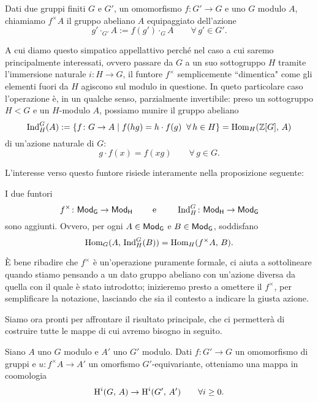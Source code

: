 \begin{definition}
	Dati due gruppi finiti $ G $ e $ G' $, un omomorfismo $ f \colon G' \to G $ e uno $ G $ modulo $ A $, chiamiamo $ f^\times A $ il gruppo abeliano $ A $ equipaggiato dell'azione
	\[ g' \cdot_{G'} A := f(g') \cdot_{G} A \qquad \forall\, g' \in G'. \]
\end{definition}

A cui diamo questo simpatico appellattivo perché nel caso a cui saremo principalmente interessati, ovvero passare da $ G $ a un suo sottogruppo $ H $ tramite l'immersione naturale $ i \colon H \to G $, il funtore $ f^\times $ semplicemente \textquotedblleft dimentica" come gli elementi fuori da $ H $ agiscono sul modulo in questione. In queto particolare caso l'operazione è, in un qualche senso, parzialmente invertibile: preso un sottogruppo $ H < G $ e un $ H $-modulo $ A $, possiamo munire il gruppo abeliano
\[ \operatorname{Ind}_H^G(A) := \{ f \colon G \to A \mid f(hg) = h \cdot f(g) \;\; \forall\, h \in H \} = \operatorname{Hom}_H(\mathbb{Z}[G], \, A) \]
di un'azione naturale di $ G $:
\[g \cdot f(x) = f(xg) \qquad\forall\, g \in G. \]

L'interesse verso questo funtore risiede interamente nella proposizione seguente:

\begin{proposition}\label{aggiunzione}
	I due funtori
	\[ f^\times \colon \mathsf{Mod}_\mathsf{G} \to \mathsf{Mod}_\mathsf{H} \qquad\text{ e }\qquad  \operatorname{Ind}_H^G \colon \mathsf{Mod}_\mathsf{H} \to \mathsf{Mod}_\mathsf{G} \]
	sono aggiunti. Ovvero, per ogni $ A \in \mathsf{Mod}_\mathsf{G} $ e $ B \in \mathsf{Mod}_\mathsf{G} $, soddisfano
	\[ \operatorname{Hom}_G(A,\, \operatorname{Ind}_H^G(B)) = \operatorname{Hom}_H(f^\times A, \, B). \]
\end{proposition}

È bene ribadire che $ f^\times $ è un'operazione puramente formale, ci aiuta a sottolineare quando stiamo pensando a un dato gruppo abeliano con un'azione diversa da quella con il quale è stato introdotto; inizieremo presto a omettere il $ f^\times $, per semplificare la notazione, lasciando che sia il contesto a indicare la giusta azione.

Siamo ora pronti per affrontare il risultato principale, che ci permetterà di costruire tutte le mappe di cui avremo bisogno in seguito.
\begin{proposition}\label{funct}
	Siano  $ A $ uno $ G $ modulo e $ A' $ uno $ G' $ modulo. Dati $ f \colon G' \to G $ un omomorfismo di gruppi e $ u \colon f^\times A \to A' $ un omorfismo $ G' $-equivariante, otteniamo una mappa in coomologia
	\[ \operatorname{H}^i(G, \, A) \to \operatorname{H}^i(G', \, A') \qquad\forall i \geq 0. \]
\end{proposition}

